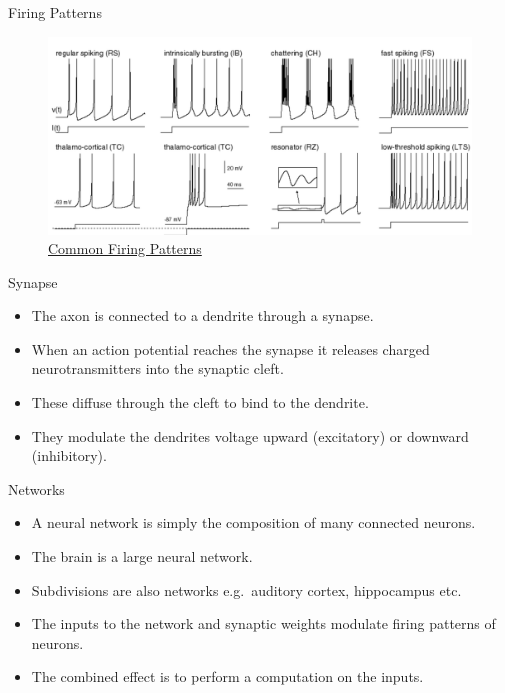 \documentclass[
  ignorenonframetext,
]{beamer}
\begin{document}
\begin{frame}{Firing Patterns}
\protect\hypertarget{firing-patterns}{}
\begin{figure}

{\centering \includegraphics{./images/spiking_patterns.png}

}

\caption{\href{https://www.izhikevich.org/publications/spikes.html}{Common
Firing Patterns}}

\end{figure}
\end{frame}

\begin{frame}{Synapse}
\protect\hypertarget{synapse}{}
\begin{itemize}
\item
  The axon is connected to a dendrite through a synapse.
\item
  When an action potential reaches the synapse it releases charged
  neurotransmitters into the synaptic cleft.
\item
  These diffuse through the cleft to bind to the dendrite.
\item
  They modulate the dendrites voltage upward (excitatory) or downward
  (inhibitory).
\end{itemize}
\end{frame}

\begin{frame}{Networks}
\protect\hypertarget{networks}{}
\begin{itemize}
\item
  A neural network is simply the composition of many connected neurons.
\item
  The brain is a large neural network.
\item
  Subdivisions are also networks e.g.~auditory cortex, hippocampus etc.
\item
  The inputs to the network and synaptic weights modulate firing
  patterns of neurons.
\item
  The combined effect is to perform a computation on the inputs.
\end{itemize}
\end{frame}
\end{document}
